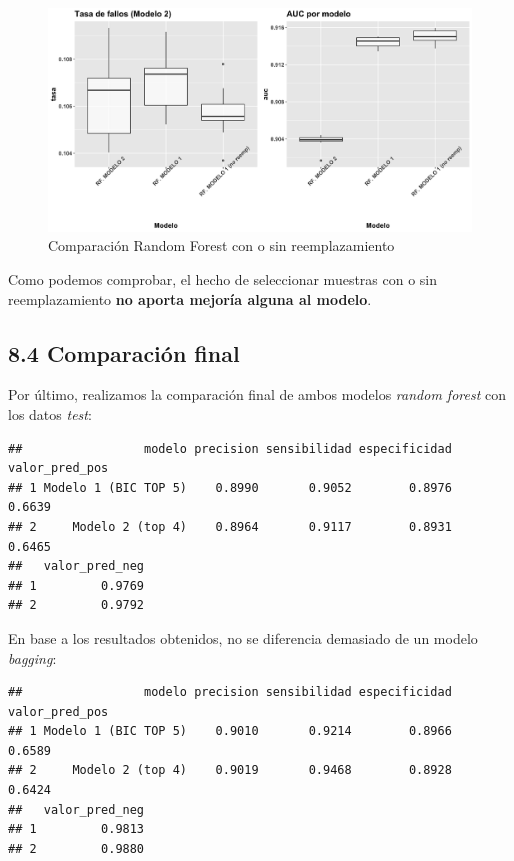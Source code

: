 \documentclass[
]{article}
\begin{document}
\begin{figure}[h!]

{\centering \includegraphics[width=0.99\linewidth,height=0.99\textheight,]{./charts/comparativas/03_rf_con_sin_reemp} 

}

\caption{Comparación Random Forest con o sin reemplazamiento}\label{fig:unnamed-chunk-100}
\end{figure}

Como podemos comprobar, el hecho de seleccionar muestras con o sin
reemplazamiento \textbf{no aporta mejoría alguna al modelo}.

\hypertarget{comparaciuxf3n-final-2}{%
\subsection{8.4 Comparación final}\label{comparaciuxf3n-final-2}}

Por último, realizamos la comparación final de ambos modelos
\emph{random forest} con los datos \emph{test}:

\begin{verbatim}
##                 modelo precision sensibilidad especificidad valor_pred_pos
## 1 Modelo 1 (BIC TOP 5)    0.8990       0.9052        0.8976         0.6639
## 2     Modelo 2 (top 4)    0.8964       0.9117        0.8931         0.6465
##   valor_pred_neg
## 1         0.9769
## 2         0.9792
\end{verbatim}

En base a los resultados obtenidos, no se diferencia demasiado de un
modelo \emph{bagging}:

\begin{verbatim}
##                 modelo precision sensibilidad especificidad valor_pred_pos
## 1 Modelo 1 (BIC TOP 5)    0.9010       0.9214        0.8966         0.6589
## 2     Modelo 2 (top 4)    0.9019       0.9468        0.8928         0.6424
##   valor_pred_neg
## 1         0.9813
## 2         0.9880
\end{verbatim}
\end{document}
